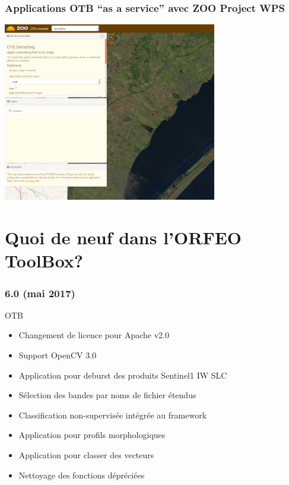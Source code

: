 \documentclass[8pt]{beamer}
\begin{document}
\begin{frame}
  \frametitle{Applications OTB ``as a service'' avec ZOO Project WPS}
\begin{minipage}[t][6cm][t]{\textwidth}
\begin{center}
\includegraphics[width=0.7\textwidth]{images/otb_in_zoo.png}
\end{center}
\end{minipage}
\end{frame}

\section{Quoi de neuf dans l'ORFEO ToolBox?}

\begin{frame}
  \frametitle{6.0 (mai 2017)}
  \begin{block}{OTB}
    \begin{itemize}
      \item Changement de licence pour Apache v2.0
      \item Support OpenCV 3.0
      \item Application pour deburst des produits Sentinel1 IW SLC
      \item Sélection des bandes par noms de fichier étendus
      \item Classification non-supervisée intégrée au framework
      \item Application pour profils morphologiques
      \item Application pour classer des vecteurs
      \item Nettoyage des fonctions dépréciées
    \end{itemize}
    \end{block}
\end{frame}
\end{document}
